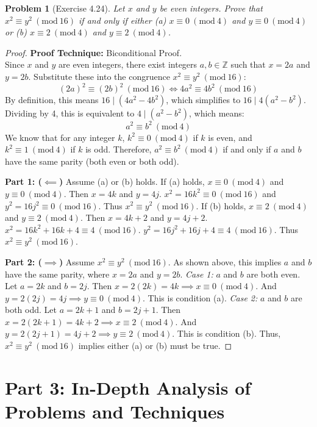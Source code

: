\documentclass[11pt]{article}
\newtheorem{problem}{Problem}
\newcommand{\Z}{\mathbb{Z}}
\newcommand{\modulo}[1]{\ (\mathrm{mod}\ #1)}
\begin{document}
\begin{problem}[Exercise 4.24]
Let $x$ and $y$ be even integers. Prove that $x^2 \equiv y^2 \modulo{16}$ if and only if either (a) $x \equiv 0 \modulo{4}$ and $y \equiv 0 \modulo{4}$ or (b) $x \equiv 2 \modulo{4}$ and $y \equiv 2 \modulo{4}$.
\end{problem}
\begin{proof}
\textbf{Proof Technique:} Biconditional Proof. \\
Since $x$ and $y$ are even integers, there exist integers $a, b \in \Z$ such that $x = 2a$ and $y = 2b$.
Substitute these into the congruence $x^2 \equiv y^2 \modulo{16}$:
\[ (2a)^2 \equiv (2b)^2 \modulo{16} \iff 4a^2 \equiv 4b^2 \modulo{16} \]
By definition, this means $16 \mid (4a^2 - 4b^2)$, which simplifies to $16 \mid 4(a^2 - b^2)$.
Dividing by 4, this is equivalent to $4 \mid (a^2 - b^2)$, which means:
\[ a^2 \equiv b^2 \modulo{4} \]
We know that for any integer $k$, $k^2 \equiv 0 \modulo{4}$ if $k$ is even, and $k^2 \equiv 1 \modulo{4}$ if $k$ is odd.
Therefore, $a^2 \equiv b^2 \modulo{4}$ if and only if $a$ and $b$ have the same parity (both even or both odd).

\textbf{Part 1: ($\impliedby$)} Assume (a) or (b) holds.
If (a) holds, $x \equiv 0 \modulo{4}$ and $y \equiv 0 \modulo{4}$. Then $x = 4k$ and $y = 4j$.
$x^2 = 16k^2 \equiv 0 \modulo{16}$ and $y^2 = 16j^2 \equiv 0 \modulo{16}$. Thus $x^2 \equiv y^2 \modulo{16}$.
If (b) holds, $x \equiv 2 \modulo{4}$ and $y \equiv 2 \modulo{4}$. Then $x = 4k+2$ and $y = 4j+2$.
$x^2 = 16k^2 + 16k + 4 \equiv 4 \modulo{16}$.
$y^2 = 16j^2 + 16j + 4 \equiv 4 \modulo{16}$.
Thus $x^2 \equiv y^2 \modulo{16}$.

\textbf{Part 2: ($\implies$)} Assume $x^2 \equiv y^2 \modulo{16}$.
As shown above, this implies $a$ and $b$ have the same parity, where $x=2a$ and $y=2b$.
\textit{Case 1:} $a$ and $b$ are both even. Let $a = 2k$ and $b = 2j$.
Then $x = 2(2k) = 4k \implies x \equiv 0 \modulo{4}$.
And $y = 2(2j) = 4j \implies y \equiv 0 \modulo{4}$. This is condition (a).
\textit{Case 2:} $a$ and $b$ are both odd. Let $a = 2k+1$ and $b = 2j+1$.
Then $x = 2(2k+1) = 4k+2 \implies x \equiv 2 \modulo{4}$.
And $y = 2(2j+1) = 4j+2 \implies y \equiv 2 \modulo{4}$. This is condition (b).
Thus, $x^2 \equiv y^2 \modulo{16}$ implies either (a) or (b) must be true.
\end{proof}

\newpage
\section{Part 3: In-Depth Analysis of Problems and Techniques}
\end{document}
